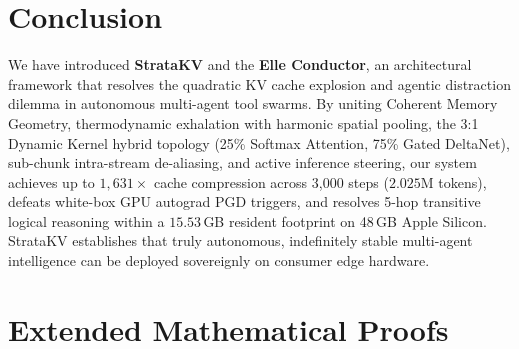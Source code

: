 \documentclass[11pt,letterpaper]{article}
\theoremstyle{definition}
\begin{document}
\section{Conclusion}
\label{sec:conclusion}

We have introduced \textbf{StrataKV} and the \textbf{Elle Conductor}, an architectural framework that resolves the quadratic KV cache explosion and agentic distraction dilemma in autonomous multi-agent tool swarms. By uniting Coherent Memory Geometry, thermodynamic exhalation with harmonic spatial pooling, the 3:1 Dynamic Kernel hybrid topology (25\% Softmax Attention, 75\% Gated DeltaNet), sub-chunk intra-stream de-aliasing, and active inference steering, our system achieves up to $1,631\times$ cache compression across 3,000 steps ($2.025\text{M}$ tokens), defeats white-box GPU autograd PGD triggers, and resolves 5-hop transitive logical reasoning within a $15.53$\,GB resident footprint on 48\,GB Apple Silicon. StrataKV establishes that truly autonomous, indefinitely stable multi-agent intelligence can be deployed sovereignly on consumer edge hardware.

\appendix
\section{Extended Mathematical Proofs}
\label{app:proofs}
\end{document}
